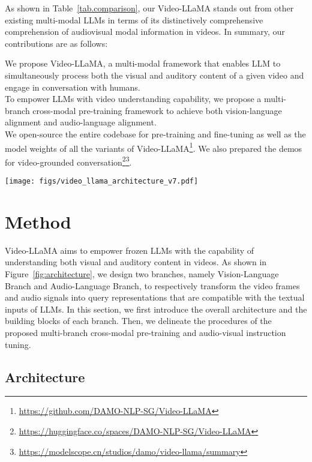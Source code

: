\documentclass[11pt]{article}
\begin{document}
As shown in Table~\ref{tab.comparison}, our Video-LLaMA stands out from other existing multi-modal LLMs in terms of its distinctively comprehensive comprehension of audiovisual modal information in videos. In summary, our contributions are as follows:

\indent  We propose Video-LLaMA, a multi-modal framework that enables LLM to simultaneously process both the visual and auditory content of a given video and engage in conversation with humans.
\\ 
\indent  To empower LLMs with video understanding capability, we propose a multi-branch cross-modal pre-training framework to achieve both vision-language alignment and audio-language alignment. \\
\indent  We open-source the entire codebase for pre-training and fine-tuning as well as the model weights of all the variants of Video-LLaMA\footnote{\url{https://github.com/DAMO-NLP-SG/Video-LLaMA}}. We also prepared the demos for video-grounded conversation\footnote{\url{https://huggingface.co/spaces/DAMO-NLP-SG/Video-LLaMA}}\footnote{\url{https://modelscope.cn/studios/damo/video-llama/summary}}.
\begin{figure*}[ht]
    \centering
    \texttt{[image: figs/video\_llama\_architecture\_v7.pdf]}
    \caption{Overall architecture of Video-LLaMA.}
    \label{fig:architecture}
\end{figure*}




\section{Method}
Video-LLaMA aims to empower frozen LLMs with the capability of understanding both visual and auditory content in videos. As shown in Figure~\ref{fig:architecture}, we design two branches, namely Vision-Language Branch and Audio-Language Branch, to respectively transform the video frames and audio signals into query representations that are compatible with the textual inputs of LLMs. In this section, we first introduce the overall architecture and the building blocks of each branch. Then, we delineate the procedures of the proposed multi-branch cross-modal pre-training and audio-visual instruction tuning.

\subsection{Architecture}
\end{document}
